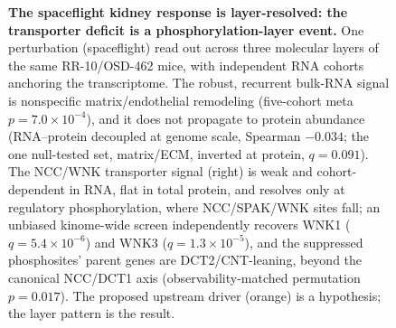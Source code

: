 \documentclass[11pt]{article}
\begin{document}
\begin{figure}[H]
\caption{\textbf{The spaceflight kidney response is layer-resolved: the transporter deficit is a phosphorylation-layer event.} One perturbation (spaceflight) read out across three molecular layers of the same RR-10/OSD-462 mice, with independent RNA cohorts anchoring the transcriptome. The robust, recurrent bulk-RNA signal is nonspecific matrix/endothelial remodeling (five-cohort meta $p=7.0\times10^{-4}$), and it does not propagate to protein abundance (RNA--protein decoupled at genome scale, Spearman $-0.034$; the one null-tested set, matrix/ECM, inverted at protein, $q=0.091$). The NCC/WNK transporter signal (right) is weak and cohort-dependent in RNA, flat in total protein, and resolves only at regulatory phosphorylation, where NCC/SPAK/WNK sites fall; an unbiased kinome-wide screen independently recovers WNK1 ($q=5.4\times10^{-6}$) and WNK3 ($q=1.3\times10^{-5}$), and the suppressed phosphosites' parent genes are DCT2/CNT-leaning, beyond the canonical NCC/DCT1 axis (observability-matched permutation $p=0.017$). The proposed upstream driver (orange) is a hypothesis; the layer pattern is the result.}
\label{fig:model}
\end{figure}
\end{document}
